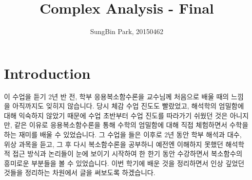 \documentclass{article}
\begin{document}
\title{Complex Analysis - Final}
\author{SungBin Park, 20150462}

\maketitle
\section{Introduction}
이 수업을 듣기 2년 반 전, 학부 응용복소함수론을 교수님께 처음으로 배울 때의 느낌을 아직까지도 잊히지 않습니다. 당시 체감 수업 진도도 빨랐었고, 해석학의 엄밀함에 대해 익숙하지 않았기 때문에 수업 초반부터 수업 진도를 따라가기 쉬웠던 것은 아니지만, 같은 이유로 응용복소함수론을 통해 수학의 엄밀함에 대해 직접 체험하면서 수학을 하는 재미를 배울 수 있었습니다. 그 수업을 들은 이후로 2년 동안 학부 해석과 대수, 위상 과목을 듣고, 그 후 다시 복소함수론을 공부하니 예전엔 이해하지 못했던 해석학적 접근 방식과 논리들이 눈에 보이기 시작하여 한 한기 동안 수강하면서 복소함수의 흥미로운 부분들을 볼 수 있었습니다. 이번 학기에 배운 것을 정리하면서 인상 깊었던 것들을 정리하는 차원에서 글을 써보도록 하겠습니다.
\end{document}

